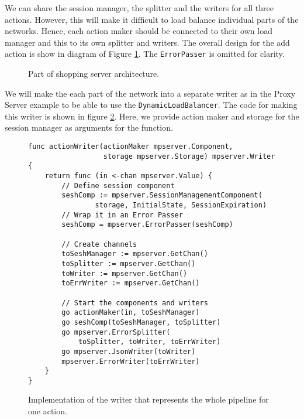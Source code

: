 We can share the session manager, the splitter and the writers for all three actions. 
However, this will make it difficult to load balance individual parts
of the networks. Hence, each action maker should be connected to their
own load manager and this to its own splitter and writers. The overall 
design for the add action
is show in diagram of Figure \ref{fig:shoppingDesign}. The \texttt{ErrorPasser} 
is omitted for clarity.
\begin{figure}[h]
\centering
{}
\caption[scale=1.0]{Part of shopping server architecture.}
\label{fig:shoppingDesign}
\end{figure}

We will make the each part of the network into a separate writer as in
the Proxy Server example to be able to use the \texttt{DynamicLoadBalancer}.
The code for making this writer is shown in figure \ref{fig:shoppingWriter}.
Here, we provide action maker and storage for the session manager 
as arguments for the function.

\newpage
\begin{figure}[h]
\begin{lstlisting}
func actionWriter(actionMaker mpserver.Component, 
                  storage mpserver.Storage) mpserver.Writer {
    return func (in <-chan mpserver.Value) {
        // Define session component
        seshComp := mpserver.SessionManagementComponent(
                storage, InitialState, SessionExpiration)
        // Wrap it in an Error Passer
        seshComp = mpserver.ErrorPasser(seshComp)

        // Create channels
        toSeshManager := mpserver.GetChan()
        toSplitter := mpserver.GetChan()
        toWriter := mpserver.GetChan()
        toErrWriter := mpserver.GetChan()

        // Start the components and writers
        go actionMaker(in, toSeshManager)
        go seshComp(toSeshManager, toSplitter)
        go mpserver.ErrorSplitter(
            toSplitter, toWriter, toErrWriter)
        go mpserver.JsonWriter(toWriter)
        mpserver.ErrorWriter(toErrWriter)
    }
}
\end{lstlisting}
\caption[scale=1.0]{Implementation of the writer that represents the whole
pipeline for one action.}
\label{fig:shoppingWriter}
\end{figure}


